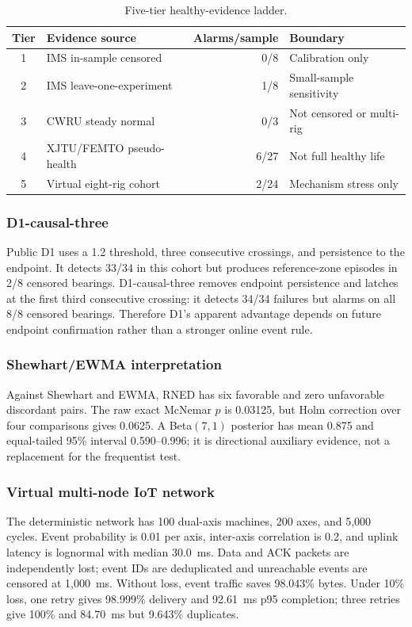 \documentclass[journal]{IEEEtran}
\begin{document}
\begin{table}[!t]
\centering
\caption{Five-tier healthy-evidence ladder.}
\label{tab:healthy-evidence}
\begin{tabular}{clrl}
\toprule
Tier & Evidence source & Alarms/sample & Boundary \\
\midrule
1 & IMS in-sample censored & 0/8 & Calibration only \\
2 & IMS leave-one-experiment & 1/8 & Small-sample sensitivity \\
3 & CWRU steady normal & 0/3 & Not censored or multi-rig \\
4 & XJTU/FEMTO pseudo-health & 6/27 & Not full healthy life \\
5 & Virtual eight-rig cohort & 2/24 & Mechanism stress only \\
\bottomrule
\end{tabular}
\end{table}

\subsubsection{D1-causal-three}
Public D1 uses a 1.2 threshold, three consecutive crossings, and persistence to the endpoint. It detects 33/34 in this cohort but produces reference-zone episodes in 2/8 censored bearings. D1-causal-three removes endpoint persistence and latches at the first third consecutive crossing: it detects 34/34 failures but alarms on all 8/8 censored bearings. Therefore D1's apparent advantage depends on future endpoint confirmation rather than a stronger online event rule.

\subsubsection{Shewhart/EWMA interpretation}
Against Shewhart and EWMA, RNED has six favorable and zero unfavorable discordant pairs. The raw exact McNemar $p$ is 0.03125, but Holm correction over four comparisons gives 0.0625. A Beta$(7,1)$ posterior has mean 0.875 and equal-tailed 95\% interval 0.590--0.996; it is directional auxiliary evidence, not a replacement for the frequentist test.

\subsubsection{Virtual multi-node IoT network}
The deterministic network has 100 dual-axis machines, 200 axes, and 5{,}000 cycles. Event probability is 0.01 per axis, inter-axis correlation is 0.2, and uplink latency is lognormal with median 30.0~ms. Data and ACK packets are independently lost; event IDs are deduplicated and unreachable events are censored at 1{,}000~ms. Without loss, event traffic saves 98.043\% bytes. Under 10\% loss, one retry gives 98.999\% delivery and 92.61~ms p95 completion; three retries give 100\% and 84.70~ms but 9.643\% duplicates.
\end{document}
